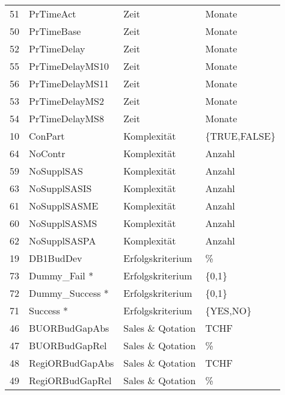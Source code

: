 \begin{longtable}[ht]{p{} p{} p{} p{}}
	51    & PrTimeAct & Zeit  & Monate \\
	50    & PrTimeBase & Zeit  & Monate \\
	52    & PrTimeDelay & Zeit  & Monate \\
	55    & PrTimeDelayMS10 & Zeit  & Monate \\
	56    & PrTimeDelayMS11 & Zeit  & Monate \\
	53    & PrTimeDelayMS2 & Zeit  & Monate \\
	54    & PrTimeDelayMS8 & Zeit  & Monate \\
	10    & ConPart & Komplexität & \{TRUE,FALSE\} \\
	64    & NoContr & Komplexität & Anzahl \\
	59    & NoSupplSAS & Komplexität & Anzahl \\
	63    & NoSupplSASIS & Komplexität & Anzahl \\
	61    & NoSupplSASME & Komplexität & Anzahl \\
	60    & NoSupplSASMS & Komplexität & Anzahl \\
	62    & NoSupplSASPA & Komplexität & Anzahl \\
	19    & DB1BudDev & Erfolgskriterium & \% \\
	73    & Dummy\_Fail * & Erfolgskriterium & \{0,1\} \\
	72    & Dummy\_Success * & Erfolgskriterium & \{0,1\} \\
	71    & Success * & Erfolgskriterium & \{YES,NO\} \\
	46    & BUORBudGapAbs & Sales \& Qotation & TCHF \\
	47    & BUORBudGapRel & Sales \& Qotation & \% \\
	48    & RegiORBudGapAbs & Sales \& Qotation & TCHF \\
	49    & RegiORBudGapRel & Sales \& Qotation & \% \\
\end{longtable}
\newpage
